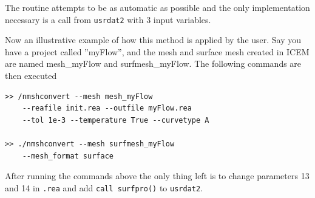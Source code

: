 The routine attempts to be as automatic as possible and the only implementation necessary is 
a call from \verb|usrdat2| with 3 input variables.

Now an illustrative example of how this method is applied by the user. Say you have a project
called ''myFlow'', and the mesh and surface mesh created in ICEM are named mesh\_myFlow and 
surfmesh\_myFlow. The following commands are then executed

%

% 
\begingroup
\fontsize{12pt}{14pt}
\begin{lstlisting}[escapechar=|,frame=none]
>> /nmshconvert --mesh mesh_myFlow 
    --reafile init.rea --outfile myFlow.rea
    --tol 1e-3 --temperature True --curvetype A

>> ./nmshconvert --mesh surfmesh_myFlow 
    --mesh_format surface

\end{lstlisting}
\endgroup
After running the commands above the only thing left is to 
change parameters 13 and 14 in \verb|.rea| and add
\verb|call surfpro()| to \verb|usrdat2|.
% 
% 
